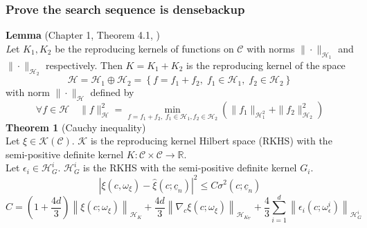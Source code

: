 \documentclass{beamer}
\let\oldcite=\cite
\renewcommand{\cite}[1]{\textcolor[rgb]{.4,.4,.85}{\oldcite{#1}}}
\begin{document}
\begin{frame}
    \frametitle{Prove the search sequence is dense\hfill \scriptsize{backup}}\scriptsize
    {\textbf{Lemma}} \scriptsize (Chapter 1, Theorem 4.1, \cite{Berlinet 11})\\
    {\emph
        Let $K_1, K_2$ be the reproducing kernels of functions on $\mathcal{C}$ with
        norms $\|\cdot\|_{\mathcal{H}_1}$ and $\|\cdot\|_{\mathcal{H}_2}$ respectively. Then $K=K_1+K_2$ is
        the reproducing kernel of the space 
        $$
            \mathcal{H} = \mathcal{H}_1\oplus \mathcal{H}_2 =
            \left\{ 
                f = f_1 + f_2, \; f_1\in \mathcal{H}_1, \; f_2\in\mathcal{H}_2
            \right\}
        $$
        with norm $\|\cdot\|_\mathcal{H}$ defined by 
        $$
            \forall f\in \mathcal{H} \quad \|f\|_{\mathcal{H}}^2 
            = \min_{
                    f=f_1+f_2,\; 
                    f_1\in \mathcal{H}_1, f_2\in \mathcal{H}_2
            }
            \left(\|f_1\|_{\mathcal{H}_1^2} + \|f_2\|_{\mathcal{H}_2}^2\right)
        $$
    }
    \vspace{.2cm}
    {\textbf{Theorem 1}} (Cauchy inequality)\\
        Let $\xi\in \mathcal{K}(\mathcal{C})$. $\mathcal{K}$ is the reproducing kernel Hilbert space 
        (RKHS)
        with the semi-positive definite kernel $K: \mathcal{C}\times \mathcal{C}\rightarrow \mathbb{R}$.
        \\
        \vspace{.2cm}
        Let $\epsilon_i\in \mathcal{H}_G^i$. $\mathcal{H}_G^i$ is the RKHS with the semi-positive  
        definite kernel $G_i$.
    $$
      \left|\xi(c,\omega_\xi) - \hat{\xi}(c;\underline{c}_n) \right|^2
      \le  C         \sigma^2(c; \underline{c}_n)
    $$
    $$
        C =
          \left(1+\frac{4d}{3}\right)  \left\| \xi(c; \omega_\xi) \right\|_{\mathcal{H}_K}
          + \frac{4d}{3} \left\| \nabla_c \xi(c;\omega_\xi)
            \right\|_{\mathcal{H}_{K_\nabla}}
          +\frac{4}{3}\sum_{i=1}^d  
           \left\| \epsilon_i(c;\omega_\epsilon^i) \right\|_{\mathcal{H}_G^i}
    $$
\end{frame}
\end{document}

